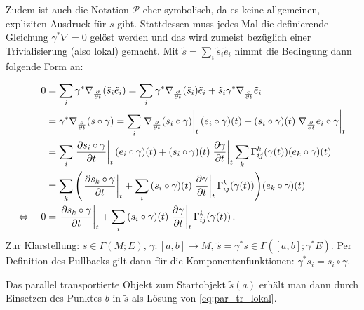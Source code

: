 \documentclass[../H_Analysis_main.tex]{subfiles}
\begin{document}
Zudem ist auch die Notation $\mathcal{P}$ eher symbolisch, da es keine allgemeinen, expliziten Ausdruck für $s$ gibt. Stattdessen muss jedes Mal die definierende Gleichung $\gamma^* \nabla = 0$ gelöst werden und das wird zumeist bezüglich einer Trivialisierung (also lokal) gemacht. Mit $\tilde{s} = \sum_i \tilde{s}_i \tilde{e}_i$ nimmt die Bedingung dann folgende Form an:
\iffalse
Für $\tilde{s} = \sum_i \tilde{s}_i \tilde{e}_i$ ergibt sich folgende lokale Darstellung der Parallelitätsbedingung:
\begin{align*}
0 &= \gamma^* \nabla \tilde{s} = \sum_i \gamma^* \nabla \qty(\tilde{s}_i \tilde{e}_i) = \sum_i \gamma^* \nabla \qty(\tilde{s}_i) \tilde{e}_i + \tilde{s}_i \gamma^* \nabla \tilde{e}_i \, .
\end{align*}
Wird nun speziell in Richtung $\pdv{t}$ abgeleitet, so ergibt sich für $\tilde{s} = \gamma^* s$:
\fi
\begin{align}
0 &= \sum_i \gamma^* \nabla_{\pdv{t}} \qty(\tilde{s}_i \tilde{e}_i) = \sum_i \gamma^* \nabla_{\pdv{t}} \qty(\tilde{s}_i) \tilde{e}_i + \tilde{s}_i \gamma^* \nabla_{\pdv{t}} \tilde{e}_i
\notag\\
&= \gamma^* \nabla_{\pdv{t}} \qty(s \circ \gamma) = \sum_i \eval{\nabla_{\pdv{t}} \qty(s_i \circ \gamma)}_t \qty(e_i \circ \gamma)(t) + \qty(s_i \circ \gamma)(t) \eval{\nabla_{\pdv{t}} e_i \circ \gamma}_t
\notag\\
&= \sum_i \eval{\pdv{s_i \circ \gamma}{t}}_t \qty(e_i \circ \gamma)(t) + \qty(s_i \circ \gamma)(t) \eval{\pdv{\gamma}{t}}_t \sum_k \Gamma_{ij}^k(\gamma(t)) \qty(e_k \circ \gamma)(t)
\notag\\
&= \sum_k \qty(\eval{\pdv{s_k \circ \gamma}{t}}_t + \sum_i \qty(s_i \circ \gamma)(t) \eval{\pdv{\gamma}{t}}_t \Gamma_{ij}^k(\gamma(t))) \qty(e_k \circ \gamma)(t)
\notag\\
\Leftrightarrow \quad 0 &= \eval{\pdv{s_k \circ \gamma}{t}}_t + \sum_i \qty(s_i \circ \gamma)(t) \eval{\pdv{\gamma}{t}}_t \Gamma_{ij}^k(\gamma(t)) \, .
\label{eq:par_tr_lokal}
\end{align}
Zur Klarstellung: $s \in \Gamma(M; E), \, \gamma: [a, b] \rightarrow M, \, \tilde{s} = \gamma^* s \in \Gamma([a, b]; \gamma^* E)$. Per Definition des Pullbacks gilt dann für die Komponentenfunktionen: $\gamma^* s_i = s_i \circ \gamma$.


Das parallel transportierte Objekt zum Startobjekt $\tilde{s}(a)$ erhält man dann durch Einsetzen des Punktes $b$ in $\tilde{s}$ als Lösung von \eqref{eq:par_tr_lokal}.
\end{document}

